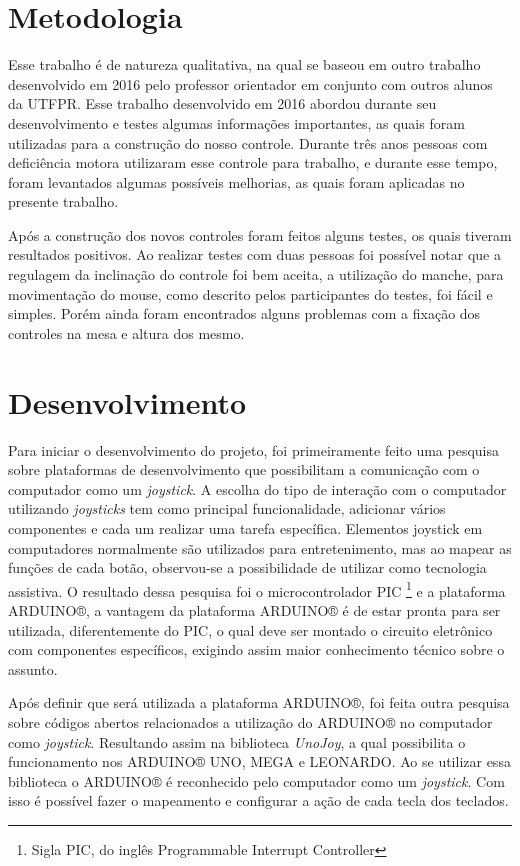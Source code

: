 \documentclass[
	12pt,			%
	openright,		%
	oneside,			%
	a4paper,			%
	chapter=TITLE,		%
	english,			%
	brazil,			%
	]{abntex2}
\begin{document}
\chapter{Metodologia}
\label{met}

Esse trabalho é de natureza qualitativa, na qual se baseou em outro trabalho desenvolvido em 2016 pelo professor orientador em conjunto com outros alunos da UTFPR. Esse trabalho desenvolvido em 2016 abordou durante seu desenvolvimento e testes algumas informações importantes, as quais foram utilizadas para a construção do nosso controle. Durante três anos pessoas com deficiência motora utilizaram esse controle para trabalho, e durante esse tempo, foram levantados algumas possíveis melhorias, as quais foram aplicadas no presente trabalho.

Após a construção dos novos controles foram feitos alguns testes, os quais tiveram resultados positivos. Ao realizar testes com duas pessoas foi possível notar que a regulagem da inclinação do controle foi bem aceita, a utilização do manche, para movimentação do mouse, como descrito pelos participantes do testes, foi fácil e simples. Porém ainda foram encontrados alguns problemas com a fixação dos controles na mesa e altura dos mesmo.

\chapter{Desenvolvimento}
\label{des}

Para iniciar o desenvolvimento do projeto, foi primeiramente feito uma pesquisa sobre plataformas de desenvolvimento que possibilitam a comunicação com o computador como um \emph{joystick}. A escolha do tipo de interação com o computador utilizando \emph{joysticks} tem como principal funcionalidade, adicionar vários componentes e cada um realizar uma tarefa específica. Elementos joystick em computadores normalmente são utilizados para entretenimento, mas ao mapear as funções de cada botão, observou-se a possibilidade de utilizar como tecnologia assistiva. O resultado dessa pesquisa foi o microcontrolador PIC \footnote{Sigla PIC, do inglês Programmable Interrupt Controller} e a plataforma ARDUINO®, a vantagem da plataforma ARDUINO® é de estar pronta para ser utilizada, diferentemente do PIC, o qual deve ser montado o circuito eletrônico com componentes específicos, exigindo assim maior conhecimento técnico sobre o assunto.

Após definir que será utilizada a plataforma ARDUINO®, foi feita outra pesquisa sobre códigos abertos relacionados a utilização do ARDUINO® no computador como \emph{joystick}. Resultando assim na biblioteca \emph{UnoJoy}, a qual possibilita o funcionamento nos ARDUINO® UNO, MEGA e LEONARDO. Ao se utilizar essa biblioteca o ARDUINO® é reconhecido pelo computador como um \emph{joystick}. Com isso é possível fazer o mapeamento e configurar a ação de cada tecla dos teclados.
\end{document}
